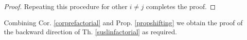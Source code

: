 \documentclass[12pt]{article}
\numberwithin{equation}{section}
\newcounter{dummy} \numberwithin{dummy}{section}
\newtheorem{definition}[dummy]{Definition}
\newtheorem{proposition}[dummy]{Proposition}
\begin{document}
\begin{proof}
		Repeating this procedure for other $i \neq j $ completes the proof.	
  \end{proof}
	
	
	Combining Cor. \ref{corprefactorial} and Prop. \ref{propshifting} we obtain the proof of the backward direction of Th. \ref{suslinfactorial} as required.
	
%	
%	
%	
%	
%	
\end{document}
